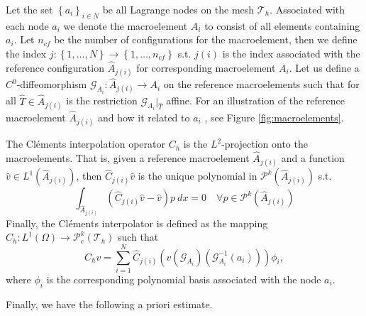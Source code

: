 \documentclass[11pt]{article}
\theoremstyle{remark}
\renewcommand{\le}{\leqslant}
\numberwithin{equation}{section}
\begin{document}
 Let the set  $\left\{ a_{i}\right\}_{i\in N}$ be all Lagrange nodes on the mesh $\mathcal{T}_{h}$. Associated with each node $a_{i}$ we denote the macroelement $A_{i}$ to consist of all elements containing $a_{i}$. Let $n_{cf}$ be the number of configurations for the macroelement, then we define the index $j:
\left\{ 1,\ldots,N \right\} \to \left\{ 1, \ldots, n_{cf} \right\}  $ s.t. $j( i) $ is the index associated with the reference configuration $\widehat{A}_{j(i) }$ for corresponding macroelement $A_{i}$.
Let us define a $C^{0}$-diffeomorphism $\mathcal{G}_{A_{i}}:
\widehat{A}_{j( i) } \to A_{i}$ on the reference macroelements such that for all $\hat{T} \in \widehat{A}_{j( i) } $ is the restriction $\mathcal{G} _{A_{i}}|_{ \hat{T} }$ affine. For an illustration of the reference
macroelement $\widehat{A}_{j( i) }$ and how it related to $a_{i}$ , see
Figure \ref{fig:macroelements}.

The Cléments interpolation operator $C_{h}$ is the $L^2$-projection onto the macroelements. That is, given
a reference macroelement $\widehat{A}_{j( i) }$ and a function $\hat{v} \in L^{1}( \widehat{A}_{j( i) })  $, then $\widehat{C}_{j( i) } \hat{v}$  is the unique polynomial in $\mathcal{P}^{k} ( \widehat{A}_{j( i) })  $ s.t. \[
\int_{  \widehat{A}_{j( i) }}^{} ( \widehat{C}_{j( i) } \hat{v} - \hat{v}) p \ dx  = 0 \quad  \forall p \in \mathcal{P}^{k} ( \widehat{A}_{j( i) })
\]
Finally, the Cléments interpolator is defined as the mapping $C_{h} : L^{1}( \Omega )  \to \mathcal{P} ^{k}_{c}(\mathcal{T}_{h}   ) $ such that
\[
C_{h} v = \sum_{i=1}^{N} \widehat{C}_{j( i) } ( v (\mathcal{G} _{A_{i}}) (\mathcal{G}^{-1}_{A_{i}}(a_{i})) )\phi _{i},
\]
where $\phi _{i}$ is the corresponding polynomial basis associated with the node $a_{i}$.



Finally, we have the following a priori estimate.
\end{document}
